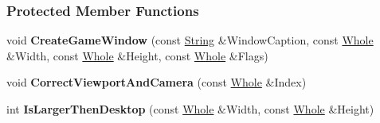 \subsubsection*{Protected Member Functions}
\begin{DoxyCompactItemize}
\item 
\hypertarget{classphys_1_1GameWindow_adc0759b53d44ac8a81018a9f961a97c9}{
void {\bfseries CreateGameWindow} (const \hyperlink{namespacephys_aa03900411993de7fbfec4789bc1d392e}{String} \&WindowCaption, const \hyperlink{namespacephys_a460f6bc24c8dd347b05e0366ae34f34a}{Whole} \&Width, const \hyperlink{namespacephys_a460f6bc24c8dd347b05e0366ae34f34a}{Whole} \&Height, const \hyperlink{namespacephys_a460f6bc24c8dd347b05e0366ae34f34a}{Whole} \&Flags)}
\label{dc/d4f/classphys_1_1GameWindow_adc0759b53d44ac8a81018a9f961a97c9}

\item 
\hypertarget{classphys_1_1GameWindow_a899c591968cc67db902eb3490b44bfec}{
void {\bfseries CorrectViewportAndCamera} (const \hyperlink{namespacephys_a460f6bc24c8dd347b05e0366ae34f34a}{Whole} \&Index)}
\label{dc/d4f/classphys_1_1GameWindow_a899c591968cc67db902eb3490b44bfec}

\item 
\hypertarget{classphys_1_1GameWindow_a94674f9c968898df68fb58f30f91542e}{
int {\bfseries IsLargerThenDesktop} (const \hyperlink{namespacephys_a460f6bc24c8dd347b05e0366ae34f34a}{Whole} \&Width, const \hyperlink{namespacephys_a460f6bc24c8dd347b05e0366ae34f34a}{Whole} \&Height)}
\label{dc/d4f/classphys_1_1GameWindow_a94674f9c968898df68fb58f30f91542e}

\end{DoxyCompactItemize}
